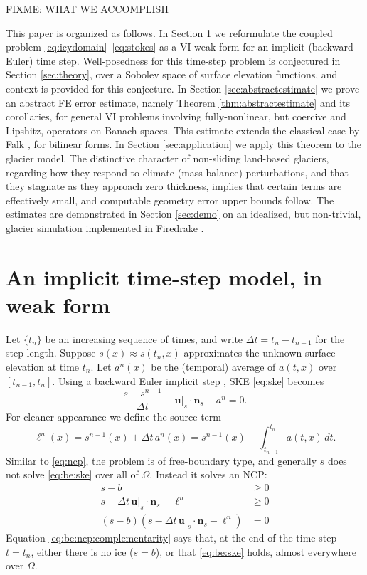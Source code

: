 \documentclass[hidelinks,onefignum,onetabnum,final]{siamart220329}  %
\newcommand{\bn}{\mathbf{n}}
\newcommand{\bu}{\mathbf{u}}
\begin{document}
FIXME: WHAT WE ACCOMPLISH

This paper is organized as follows.  In Section \ref{sec:model} we reformulate the coupled problem \eqref{eq:icydomain}--\eqref{eq:stokes} as a VI weak form for an implicit (backward Euler) time step.  Well-posedness for this time-step problem is conjectured in Section \ref{sec:theory}, over a Sobolev space of surface elevation functions, and context is provided for this conjecture.  In Section \ref{sec:abstractestimate} we prove an abstract FE error estimate, namely Theorem \ref{thm:abstractestimate} and its corollaries, for general VI problems involving fully-nonlinear, but coercive and Lipshitz, operators on Banach spaces.  This estimate extends the classical case by Falk \cite{Falk1974}, for bilinear forms.  In Section \ref{sec:application} we apply this theorem to the glacier model.  The distinctive character of non-sliding land-based glaciers, regarding how they respond to climate (mass balance) perturbations, and that they stagnate as they approach zero thickness, implies that certain terms are effectively small, and computable geometry error upper bounds follow.  The estimates are demonstrated in Section \ref{sec:demo} on an idealized, but non-trivial, glacier simulation implemented in Firedrake \cite{Hametal2023}.


\section{An implicit time-step model, in weak form} \label{sec:model}

Let $\{t_n\}$ be an increasing sequence of times, and write $\Delta t = t_n-t_{n-1}$ for the step length.  Suppose $s(x)\approx s(t_n,x)$ approximates the unknown surface elevation at time $t_n$.  Let $a^n(x)$ be the (temporal) average of $a(t,x)$ over $[t_{n-1},t_n]$.  Using a backward Euler implicit step \cite{AscherPetzold1998}, SKE \eqref{eq:ske} becomes
\begin{equation}
\frac{s - s^{n-1}}{\Delta t} - \bu|_{s} \cdot \bn_{s} - a^n = 0. \label{eq:be:ske}
\end{equation}
For cleaner appearance we define the source term
\begin{equation}
\ell^n(x) = s^{n-1}(x)+\Delta t\,a^n(x) = s^{n-1}(x) + \int_{t_{n-1}}^{t_n} a(t,x)\,dt. \label{eq:be:source}
\end{equation}
Similar to \eqref{eq:ncp}, the problem is of free-boundary type, and generally $s$ does not solve \eqref{eq:be:ske} over all of $\Omega$.  Instead it solves an NCP:
\begin{subequations}
\label{eq:be:ncp}
\begin{align}
s - b &\ge 0 \label{eq:be:ncp:constraint} \\
s - \Delta t\,\bu|_s \cdot \bn_s - \ell^n &\ge 0 \\
(s - b) \left(s - \Delta t\,\bu|_s \cdot \bn_s - \ell^n\right) &= 0 \label{eq:be:ncp:complementarity}
\end{align}
\end{subequations}
Equation \eqref{eq:be:ncp:complementarity} says that, at the end of the time step $t=t_n$, either there is no ice ($s=b$), or that \eqref{eq:be:ske} holds, almost everywhere over $\Omega$.
\end{document}
